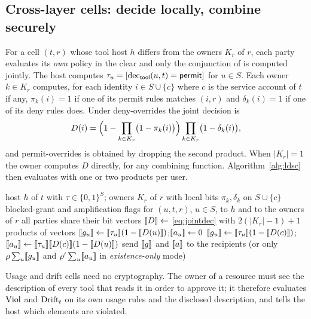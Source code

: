 \subsection{Cross-layer cells: decide locally, combine securely}\label{sec:ldsc}
For a cell $(t, r)$ whose tool host $h$ differs from the owners $K_r$ of $r$, each party evaluates its \emph{own} policy in the clear and only the conjunction of  is computed jointly. The host computes $\tau_u = [\mathrm{dec}_{\mathsf{tool}}(u, t) = \mathsf{permit}]$ for $u \in S$. Each owner $k \in K_r$ computes, for each identity $i \in S \cup \{c\}$ where $c$ is the service account of $t$ if any, $\pi_k(i) = 1$ if one of its permit rules matches $(i, r)$ and $\delta_k(i) = 1$ if one of its deny rules does. Under deny-overrides the joint decision is
\begin{equation}
D(i) = \Bigl(1 - \prod_{k \in K_r} \bigl(1 - \pi_k(i)\bigr)\Bigr) \prod_{k \in K_r} \bigl(1 - \delta_k(i)\bigr), \label{eq:jointdec}
\end{equation}
and permit-overrides is obtained by dropping the second product. When $|K_r| = 1$ the owner computes $D$ directly, for any combining function. Algorithm~\ref{alg:ldsc} then evaluates  with one or two products per user.

\begin{algorithm}[t]
\caption{$\textsc{CellSecure}(t, r)$: decide locally, combine securely}\label{alg:ldsc}
\begin{algorithmic}[1]
\Require host $h$ of $t$ with $\tau \in \{0,1\}^{S}$; owners $K_r$ of $r$ with local bits $\pi_k, \delta_k$ on $S \cup \{c\}$
\Ensure blocked-grant and amplification flags for $(u, t, r)$, $u \in S$, to $h$ and to the owners of $r$
\State all parties share their bit vectors
\State $[\![D]\!] \gets$ \eqref{eq:jointdec} with $2(|K_r| - 1) + 1$ products of vectors 
  \State $[\![g_u]\!] \gets [\![\tau_u]\!](1 - [\![D(u)]\!])$;\quad $[\![a_u]\!] \gets 0$
\Else {}
  \State $[\![g_u]\!] \gets [\![\tau_u]\!](1 - [\![D(c)]\!])$;\quad $\shr{a_u} \gets \shr{\tau_u}\shr{D(c)}(1 - \shr{D(u)})$
\EndIf
\State send $[\![g]\!]$ and $[\![a]\!]$ to the recipients (or only $\rho \sum_u [\![g_u]\!]$ and $\rho' \sum_u [\![a_u]\!]$ in \emph{existence-only} mode)
\end{algorithmic}
\end{algorithm}

Usage and drift cells need no cryptography. The owner of a resource must see the description of every tool that reads it in order to approve it; it therefore evaluates $\mathrm{Viol}$ and $\mathrm{Drift}_t$ on its own usage rules and the disclosed description, and tells the host which elements are violated.


